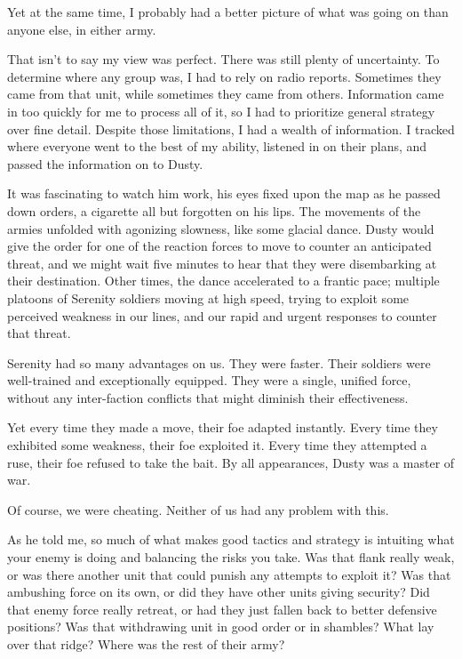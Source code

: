Yet at the same time, I probably had a better picture of what was going on than anyone else, in either army.

That isn’t to say my view was perfect. There was still plenty of uncertainty. To determine where any group was, I had to rely on radio reports. Sometimes they came from that unit, while sometimes they came from others. Information came in too quickly for me to process all of it, so I had to prioritize general strategy over fine detail. Despite those limitations, I had a wealth of information. I tracked where everyone went to the best of my ability, listened in on their plans, and passed the information on to Dusty.

It was fascinating to watch him work, his eyes fixed upon the map as he passed down orders, a cigarette all but forgotten on his lips. The movements of the armies unfolded with agonizing slowness, like some glacial dance. Dusty would give the order for one of the reaction forces to move to counter an anticipated threat, and we might wait five minutes to hear that they were disembarking at their destination. Other times, the dance accelerated to a frantic pace; multiple platoons of Serenity soldiers moving at high speed, trying to exploit some perceived weakness in our lines, and our rapid and urgent responses to counter that threat.

Serenity had so many advantages on us. They were faster. Their soldiers were well-trained and exceptionally equipped. They were a single, unified force, without any inter-faction conflicts that might diminish their effectiveness.

Yet every time they made a move, their foe adapted instantly. Every time they exhibited some weakness, their foe exploited it. Every time they attempted a ruse, their foe refused to take the bait. By all appearances, Dusty was a master of war.

Of course, we were cheating. Neither of us had any problem with this.

As he told me, so much of what makes good tactics and strategy is intuiting what your enemy is doing and balancing the risks you take. Was that flank really weak, or was there another unit that could punish any attempts to exploit it? Was that ambushing force on its own, or did they have other units giving security? Did that enemy force really retreat, or had they just fallen back to better defensive positions? Was that withdrawing unit in good order or in shambles? What lay over that ridge? Where was the rest of their army?

